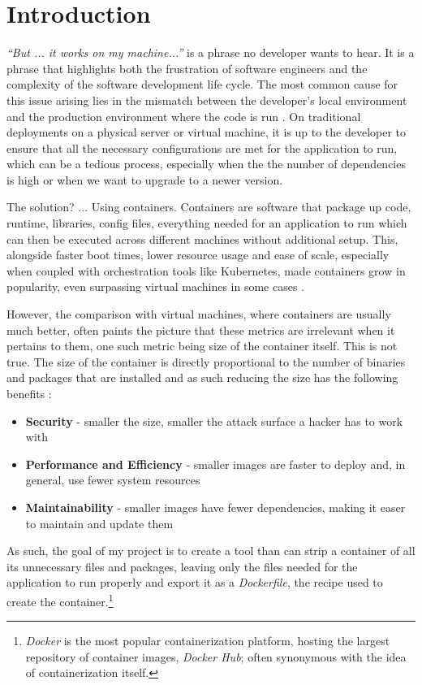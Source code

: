 \chapter{Introduction}
\label{chapter:intro}

\textit{“But ... it works on my machine...”} is a phrase no developer wants to hear.
It is a phrase that highlights both the frustration of software engineers and the complexity of
the software development life cycle. The most common cause for this issue arising lies in the
mismatch between the developer's local environment and the production environment where the code is run
\cite{but-it-works-on-my-machine}. On traditional deployments on a physical server or virtual machine, it is
up to the developer to ensure that all the necessary configurations are met for the application to run,
which can be a tedious process, especially when the the number of dependencies is high or when we want to 
upgrade to a newer version.

The solution? ... Using containers. Containers are software that package up code,
runtime, libraries, config files, everything needed for an application to run \cite{what-are-containers} which 
can then be executed across different machines without additional setup. This, alongside
faster boot times, lower resource usage and ease of scale, especially when coupled with orchestration tools like Kubernetes, made containers 
grow in popularity, even surpassing virtual machines in some cases \cite{containers-usage-statistics}.

However, the comparison with virtual machines, where containers are usually much better, often paints the picture that
these metrics are irrelevant when it pertains to them, one such metric being size of the container itself. This is not true.
The size of the container is directly proportional to the number of binaries and packages that are installed and as such
reducing the size has the following benefits \cite{why-keep-containers-small}:
\begin{itemize}
    \item \textbf{Security} - smaller the size, smaller the attack surface a hacker has to work with
    \item \textbf{Performance and Efficiency} - smaller images are faster to deploy and, in general, use fewer system resources
    \item \textbf{Maintainability} - smaller images have fewer dependencies, making it easer to maintain and update them
\end{itemize}

As such, the goal of my project is to create a tool than can strip a container of all its unnecessary files and packages,
leaving only the files needed for the application to run properly and export it as a \textit{Dockerfile}, the recipe used to create the container.\footnote[1]{
   \textit{Docker} is the most popular containerization platform, hosting the largest repository of container images, \textit{Docker Hub}; often synonymous with the idea of containerization itself. 
}
 